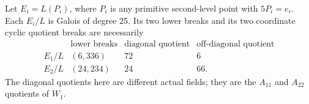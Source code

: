 \begin{proposition}
\label{prop:B-RD88-point-fields}
Let \(E_i=L(P_i)\), where \(P_i\) is any primitive
second-level point with \(5P_i=e_i\).
Each \(E_i/L\) is Galois of degree 25.
Its two lower breaks and its two coordinate cyclic
quotient breaks are necessarily
\[
\begin{array}{c|c|c|c}
 &\text{lower breaks}&\text{diagonal quotient}&\text{off-diagonal quotient}\\\hline
 E_1/L&(6,336)&72&6\\
 E_2/L&(24,234)&24&66.
\end{array}                                             \tag{B-RD88.1}
\]
The diagonal quotients here are different actual fields;
they are the \(A_{11}\) and \(A_{22}\) quotients of \(W_1\).
\end{proposition}
